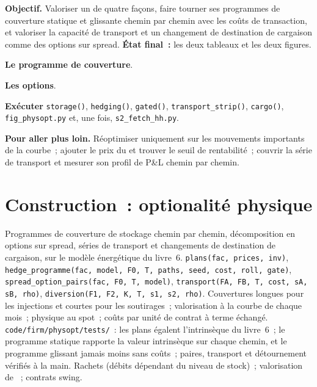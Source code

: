 \begin{tutorial}
\textbf{Objectif.} Valoriser un  de quatre façons, faire tourner ses programmes de couverture statique et glissante chemin par chemin avec les coûts de transaction, et valoriser la
capacité de transport et un changement de destination de cargaison comme des options sur spread. \textbf{État final~:} les deux tableaux et les deux figures.
\begin{tutsteps}
\item \textbf{Le programme de couverture}.
\label{lst:s2:storage-transport-and-physical-optionality:programme}
\item \textbf{Les options}.
\label{lst:s2:storage-transport-and-physical-optionality:options}
\item \textbf{Exécuter} \texttt{storage()}, \texttt{hedging()}, \texttt{gated()}, \texttt{transport\_strip()}, \texttt{cargo()},
\texttt{fig\_physopt.py} et, une fois, \texttt{s2\_fetch\_hh.py}.
\end{tutsteps}
\textbf{Pour aller plus loin.} Réoptimiser uniquement sur les mouvements importants de la courbe~; ajouter le prix du  et trouver le seuil de rentabilité~; couvrir la série de transport et
mesurer son profil de P\&L chemin par chemin.
\end{tutorial}

\section{Construction~: optionalité physique}\label{bld:s2:storage-transport-and-physical-optionality:physopt}

\begin{build}
 Programmes de couverture de stockage chemin par chemin, décomposition en options sur spread, séries de transport et changements de destination de cargaison, sur le modèle énergétique du livre~6.
 \texttt{plans(fac, prices, inv)}, \texttt{hedge\_programme(fac, model, F0, T, paths, seed, cost, roll, gate)},
\texttt{spread\_option\_pairs(fac, F0, T, model)}, \texttt{transport(FA, FB, T, cost, sA, sB, rho)},
\texttt{diversion(F1, F2, K, T, s1, s2, rho)}.
 Couvertures longues pour les injections et courtes pour les soutirages~; valorisation à la courbe de chaque mois~; physique au spot~; coûts par unité de contrat à terme échangé.
 \texttt{code/firm/physopt/tests/}~: les plans égalent l'intrinsèque du livre~6~; le programme statique rapporte la valeur intrinsèque sur chaque
chemin, et le programme glissant jamais moins sans coûts~; paires, transport et détournement vérifiés à la main.
 Rachets (débits dépendant du niveau de stock)~; valorisation de ~; contrats swing.
\end{build}

